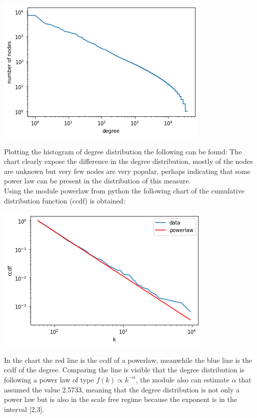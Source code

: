 \documentclass[]{article}
\begin{document}
    \begin{center}
        \includegraphics[scale=0.50]{charts/degree_dist_plot.png}
        \end{center}
    Plotting the histogram of degree distribution the following can be found:
    The chart clearly expose the difference in the degree distribution, mostly of the nodes are unknown but very few nodes are very popular, perhaps indicating that some power law can be present in the distribution of this measure. \\
    Using the module powerlaw from python the following chart of the cumulative distribution function (ccdf) is obtained:
    \begin{center}
    \includegraphics[scale=0.5]{charts/powerlaw.png}
    \end{center}
    In the chart the red line is the ccdf of a powerlaw, meanwhile the blue line is the ccdf of the degree. Comparing the line is visible that the degree distribution is following a power law of type $f(k) \propto k^{-\alpha}$, the module also can estimate $\alpha$ that assumed the value 2.5733, meaning that the degree distribution is not only a power law but is also in the scale free regime because the exponent is in the interval [2,3].


    
\end{document}
